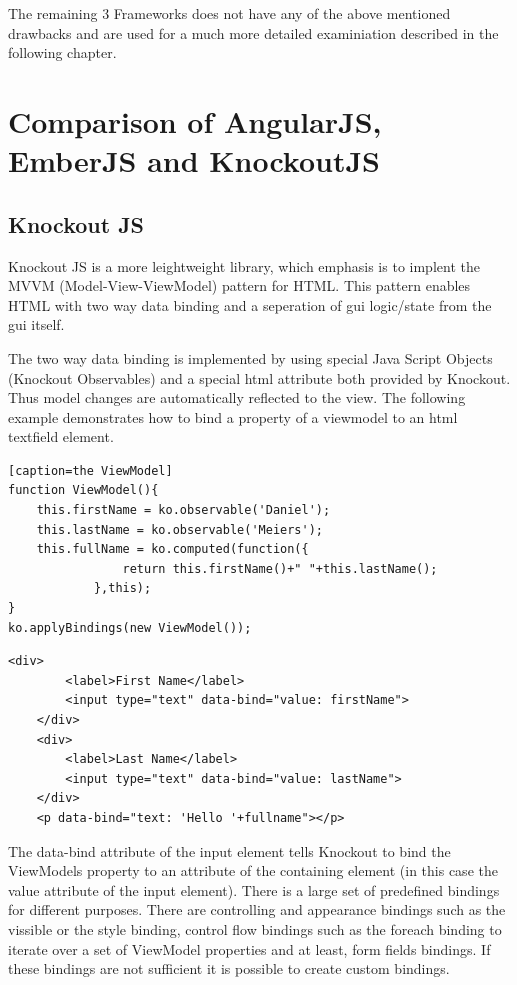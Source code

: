 The remaining 3 Frameworks does not have any of the above mentioned drawbacks and are used for a much more detailed examiniation described in the following chapter.

\section{Comparison of AngularJS, EmberJS and KnockoutJS}\label{chap:detail_comparison}

\subsection{Knockout JS}

Knockout JS is a more leightweight library, which emphasis is to implent the MVVM (Model-View-ViewModel) pattern for HTML. This pattern enables HTML with two way data binding and a seperation of gui logic/state from the gui itself.


The two way data binding is implemented by using special Java Script Objects (Knockout Observables) and a special html attribute both provided by Knockout. Thus model changes are automatically reflected to the view. The following example demonstrates how to bind a property of a viewmodel to an html textfield element.


\begin{lstlisting}[label=knockout_js][caption=the ViewModel]
function ViewModel(){
	this.firstName = ko.observable('Daniel');
	this.lastName = ko.observable('Meiers');
	this.fullName = ko.computed(function({
				return this.firstName()+" "+this.lastName();
			},this); 
}
ko.applyBindings(new ViewModel());
\end{lstlisting}

\begin{lstlisting}[caption=the html view]
 	<div>
		<label>First Name</label> 
		<input type="text" data-bind="value: firstName">
	</div>
	<div>
		<label>Last Name</label> 
		<input type="text" data-bind="value: lastName">
	</div>
	<p data-bind="text: 'Hello '+fullname"></p>
\end{lstlisting}

The data-bind attribute of the input element tells Knockout to bind the ViewModels property to an attribute of the containing element (in this case the value attribute of the input element). There is a large set of predefined bindings for different purposes. There are controlling and appearance bindings such as the vissible or the style binding, control flow bindings such as the foreach binding to iterate over a set of ViewModel properties and at least, form fields bindings. If these bindings are not sufficient it is possible to create custom bindings.

